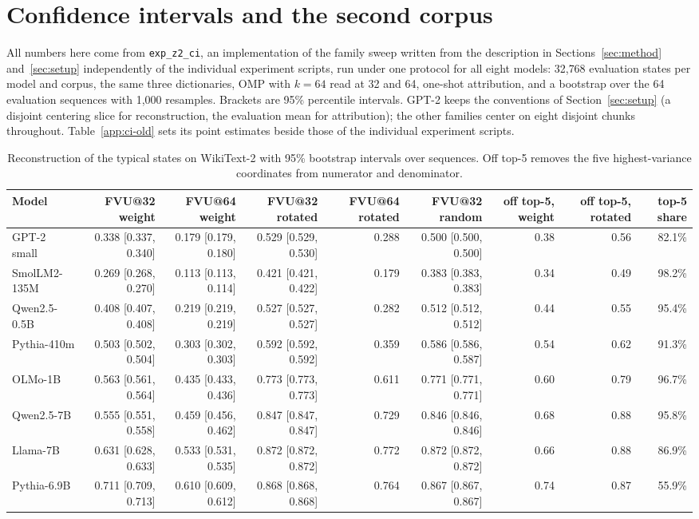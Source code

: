 \section{Confidence intervals and the second corpus}\label{app:ci}
All numbers here come from \texttt{exp\_z2\_ci}, an implementation of the family sweep written from the description in Sections~\ref{sec:method} and~\ref{sec:setup} independently of the individual experiment scripts, run under one protocol for all eight models: 32{,}768 evaluation states per model and corpus, the same three dictionaries, OMP with $k=64$ read at 32 and 64, one-shot attribution, and a bootstrap over the 64 evaluation sequences with 1{,}000 resamples. Brackets are 95\% percentile intervals. GPT-2 keeps the conventions of Section~\ref{sec:setup} (a disjoint centering slice for reconstruction, the evaluation mean for attribution); the other families center on eight disjoint chunks throughout. Table~\ref{app:ci-old} sets its point estimates beside those of the individual experiment scripts.
\begin{table}[H]\centering\scriptsize
\caption{Reconstruction of the typical states on WikiText-2 with 95\% bootstrap intervals over sequences. Off top-5 removes the five highest-variance coordinates from numerator and denominator.}\label{app:ci-recon-wikitext}
\begin{adjustbox}{max width=\linewidth}
\begin{tabular}{lrrrrrrrr}\toprule
Model & FVU@32 weight & FVU@64 weight & FVU@32 rotated & FVU@64 rotated & FVU@32 random & off top-5, weight & off top-5, rotated & top-5 share \\ \midrule
GPT-2 small & 0.338 [0.337, 0.340] & 0.179 [0.179, 0.180] & 0.529 [0.529, 0.530] & 0.288 & 0.500 [0.500, 0.500] & 0.38 & 0.56 & 82.1\% \\
SmolLM2-135M & 0.269 [0.268, 0.270] & 0.113 [0.113, 0.114] & 0.421 [0.421, 0.422] & 0.179 & 0.383 [0.383, 0.383] & 0.34 & 0.49 & 98.2\% \\
Qwen2.5-0.5B & 0.408 [0.407, 0.408] & 0.219 [0.219, 0.219] & 0.527 [0.527, 0.527] & 0.282 & 0.512 [0.512, 0.512] & 0.44 & 0.55 & 95.4\% \\
Pythia-410m & 0.503 [0.502, 0.504] & 0.303 [0.302, 0.303] & 0.592 [0.592, 0.592] & 0.359 & 0.586 [0.586, 0.587] & 0.54 & 0.62 & 91.3\% \\
OLMo-1B & 0.563 [0.561, 0.564] & 0.435 [0.433, 0.436] & 0.773 [0.773, 0.773] & 0.611 & 0.771 [0.771, 0.771] & 0.60 & 0.79 & 96.7\% \\
Qwen2.5-7B & 0.555 [0.551, 0.558] & 0.459 [0.456, 0.462] & 0.847 [0.847, 0.847] & 0.729 & 0.846 [0.846, 0.846] & 0.68 & 0.88 & 95.8\% \\
Llama-7B & 0.631 [0.628, 0.633] & 0.533 [0.531, 0.535] & 0.872 [0.872, 0.872] & 0.772 & 0.872 [0.872, 0.872] & 0.66 & 0.88 & 86.9\% \\
Pythia-6.9B & 0.711 [0.709, 0.713] & 0.610 [0.609, 0.612] & 0.868 [0.868, 0.868] & 0.764 & 0.867 [0.867, 0.867] & 0.74 & 0.87 & 55.9\% \\
\bottomrule\end{tabular}\end{adjustbox}
\end{table}
